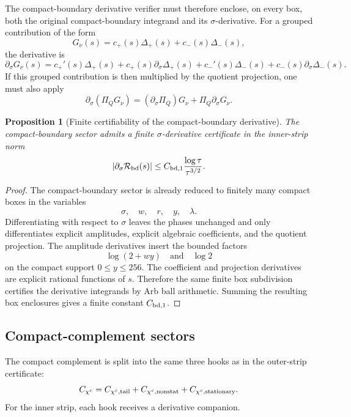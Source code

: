 \documentclass[11pt]{article}
\newtheorem{proposition}[theorem]{Proposition}
\begin{document}
The compact-boundary derivative verifier must therefore enclose, on every box,
both the original compact-boundary integrand and its \(\sigma\)-derivative.
For a grouped contribution of the form
\[
        G_\nu(s)
        =
        c_+(s)\Delta_+(s)
        +
        c_-(s)\Delta_-(s),
\]
the derivative is
\[
        \partial_\sigma G_\nu(s)
        =
        c_+'(s)\Delta_+(s)
        +
        c_+(s)\partial_\sigma\Delta_+(s)
        +
        c_-'(s)\Delta_-(s)
        +
        c_-(s)\partial_\sigma\Delta_-(s).
\]
If this grouped contribution is then multiplied by the quotient projection,
one must also apply
\[
        \partial_\sigma(\Pi_Q G_\nu)
        =
        (\partial_\sigma\Pi_Q)G_\nu
        +
        \Pi_Q\partial_\sigma G_\nu.
\]

\begin{proposition}[Finite certifiability of the compact-boundary derivative]
\label{prop:bd-derivative-certifiable}
The compact-boundary sector admits a finite \(\sigma\)-derivative certificate
in the inner-strip norm
\[
        |\partial_\sigma\mathcal R_{\rm bd}(s)|
        \le
        C_{{\rm bd},1}
        \frac{\log\tau}{\tau^{3/2}}.
\]
\end{proposition}

\begin{proof}
The compact-boundary sector is already reduced to finitely many compact boxes
in the variables
\[
        \sigma,\quad w,\quad r,\quad y,\quad \lambda.
\]
Differentiating with respect to \(\sigma\) leaves the phases unchanged and
only differentiates explicit amplitudes, explicit algebraic coefficients, and
the quotient projection.  The amplitude derivatives insert the bounded factors
\[
        \log(2+wy)
        \quad\text{and}\quad
        \log2
\]
on the compact support \(0\le y\le256\).  The coefficient and projection
derivatives are explicit rational functions of \(s\).  Therefore the same
finite box subdivision certifies the derivative integrands by Arb ball
arithmetic.  Summing the resulting box enclosures gives a finite constant
\(C_{{\rm bd},1}\).
\end{proof}

\subsection{Compact-complement sectors}

The compact complement is split into the same three hooks as in the
outer-strip certificate:
\[
        C_{\chi^c}
        =
        C_{\chi^c,{\rm tail}}
        +
        C_{\chi^c,{\rm nonstat}}
        +
        C_{\chi^c,{\rm stationary}}.
\]
For the inner strip, each hook receives a derivative companion.
\end{document}
